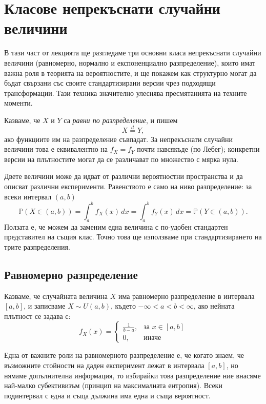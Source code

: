 \section{Класове непрекъснати случайни величини}

В тази част от лекцията ще разгледаме три основни класа непрекъснати случайни величини (равномерно, нормално и експоненциално разпределение), които имат важна роля в теорията на вероятностите, и ще покажем как структурно могат да бъдат свързани със своите стандартизирани версии чрез подходящи трансформации. Тази техника значително улеснява пресмятанията на техните моменти.

\begin{defn}
Казваме, че $X$ и $Y$ са \emph{равни по разпределение}, и пишем
\[
X\overset{d}{=}Y,
\]
ако функциите им на разпределение съвпадат. За непрекъснати случайни величини това е еквивалентно на $f_X=f_Y$ почти навсякъде (по Лебег); конкретни версии на плътностите могат да се различават по множество с мярка нула.
\end{defn}

Двете величини може да идват от различни вероятностни пространства и да описват различни експерименти. Равенството е само на ниво разпределение: за всеки интервал $(a,b)$
\[
\mathbb{P}(X\in(a,b))
=\int_a^b f_X(x)\,dx
=\int_a^b f_Y(x)\,dx
=\mathbb{P}(Y\in(a,b)).
\]
Ползата е, че можем да заменим една величина с по-удобен стандартен представител на същия клас. Точно това ще използваме при стандартизирането на трите разпределения.

\subsection{Равномерно разпределение}

Казваме, че случайната величина $X$ има равномерно разпределение в интервала $[a, b]$, и записваме $X \sim U(a, b)$, където $-\infty < a < b < \infty$, ако нейната плътност се задава с:
\[
f_X(x) =
\begin{cases}
\frac{1}{b-a}, & \text{за } x \in [a, b] \\
0, & \text{иначе}
\end{cases}
\]

Една от важните роли на равномерното разпределение е, че когато знаем, че възможните стойности на даден експеримент лежат в интервала $[a, b]$, но нямаме допълнителна информация, то избирайки това разпределение ние внасяме най-малко субективизъм (принцип на максималната ентропия). Всеки подинтервал с една и съща дължина има една и съща вероятност.

